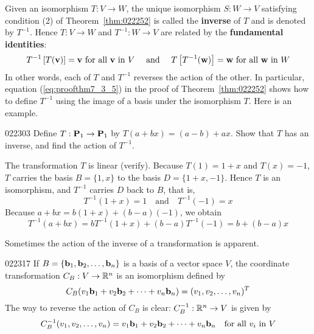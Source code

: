 Given an isomorphism $T : V \to W$, the unique isomorphism $S : W \to V$ satisfying condition (2) of Theorem~\ref{thm:022252} is called the \textbf{inverse} of $T$ and is denoted by $T^{-1}$. Hence $T : V \to W$ and $T^{-1} : W \to V$ are related by the \textbf{fundamental identities}:
\begin{equation*}
T^{-1}\left[T(\textbf{v})\right] = \textbf{v} \mbox{ for all } \textbf{v} \mbox{ in } V \quad \mbox{ and } \quad T\left[T^{-1}(\textbf{w})\right] = \textbf{w} \mbox{ for all } \textbf{w} \mbox{ in } W
\end{equation*}
In other words, each of $T$ and $T^{-1}$ reverses the action of the other. In particular, equation (\ref{eq:proofthm7_3_5}) in the proof of Theorem~\ref{thm:022252} shows how to define $T^{-1}$ using the image of a basis under the isomorphism $T$. Here is an example.


\begin{example}{}{022303}
Define $T : \textbf{P}_{1} \to \textbf{P}_{1}$ by $T(a + bx) = (a - b) + ax$. Show that $T$ has an inverse, and find the action of $T^{-1}$.


\begin{solution}
  The transformation $T$ is linear (verify). Because $T(1) = 1 + x$ and $T(x) = -1$, $T$ carries the basis $B = \{1, x\}$ to the basis $D = \{1 + x, -1\}$. Hence $T$ is an isomorphism, and $T^{-1}$ carries $D$ back to $B$, that is,
\begin{equation*}
T^{-1}(1 + x) = 1 \quad \mbox{and} \quad T^{-1}(-1) = x
\end{equation*}
Because $a + bx = b(1 + x) + (b - a)(-1)$, we obtain
\begin{equation*}
T^{-1}(a + bx) = bT^{-1}(1 + x) + (b - a)T^{-1}(-1) = b + (b -a)x
\end{equation*}
\end{solution}
\end{example}

Sometimes the action of the inverse of a transformation is apparent.


\begin{example}{}{022317}
If $B = \{\textbf{b}_{1}, \textbf{b}_{2}, \dots, \textbf{b}_{n}\}$ is a basis of a vector space $V$, the coordinate transformation $C_{B} : V \to \mathbb{R}^n$ is an isomorphism defined by
\begin{equation*}
C_B(v_1\textbf{b}_1 + v_2\textbf{b}_2 + \cdots + v_n\textbf{b}_n) = (v_1, v_2, \dots, v_n)^T
\end{equation*}
The way to reverse the action of $C_{B}$ is clear: $C_{B}^{-1} : \mathbb{R}^n \to V$ is given by
\begin{equation*}
C_B^{-1}(v_1, v_2, \dots, v_n) = v_1\textbf{b}_1 + v_2\textbf{b}_2 + \cdots + v_n\textbf{b}_n \quad \mbox{for all } v_i \mbox{ in } V
\end{equation*}
\end{example}

